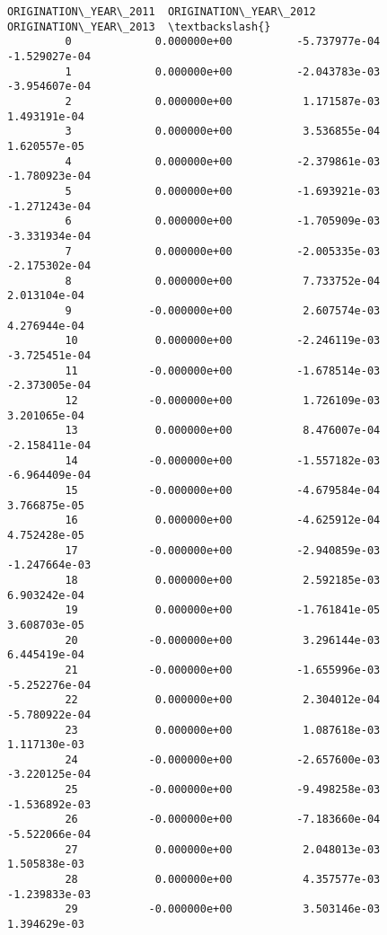 \documentclass[11pt]{article}
\begin{document}
\begin{Verbatim}[commandchars=\\\{\}]
              ORIGINATION\_YEAR\_2011  ORIGINATION\_YEAR\_2012  ORIGINATION\_YEAR\_2013  \textbackslash{}
         0             0.000000e+00          -5.737977e-04          -1.529027e-04   
         1             0.000000e+00          -2.043783e-03          -3.954607e-04   
         2             0.000000e+00           1.171587e-03           1.493191e-04   
         3             0.000000e+00           3.536855e-04           1.620557e-05   
         4             0.000000e+00          -2.379861e-03          -1.780923e-04   
         5             0.000000e+00          -1.693921e-03          -1.271243e-04   
         6             0.000000e+00          -1.705909e-03          -3.331934e-04   
         7             0.000000e+00          -2.005335e-03          -2.175302e-04   
         8             0.000000e+00           7.733752e-04           2.013104e-04   
         9            -0.000000e+00           2.607574e-03           4.276944e-04   
         10            0.000000e+00          -2.246119e-03          -3.725451e-04   
         11           -0.000000e+00          -1.678514e-03          -2.373005e-04   
         12           -0.000000e+00           1.726109e-03           3.201065e-04   
         13            0.000000e+00           8.476007e-04          -2.158411e-04   
         14           -0.000000e+00          -1.557182e-03          -6.964409e-04   
         15           -0.000000e+00          -4.679584e-04           3.766875e-05   
         16            0.000000e+00          -4.625912e-04           4.752428e-05   
         17           -0.000000e+00          -2.940859e-03          -1.247664e-03   
         18            0.000000e+00           2.592185e-03           6.903242e-04   
         19            0.000000e+00          -1.761841e-05           3.608703e-05   
         20           -0.000000e+00           3.296144e-03           6.445419e-04   
         21           -0.000000e+00          -1.655996e-03          -5.252276e-04   
         22            0.000000e+00           2.304012e-04          -5.780922e-04   
         23            0.000000e+00           1.087618e-03           1.117130e-03   
         24           -0.000000e+00          -2.657600e-03          -3.220125e-04   
         25           -0.000000e+00          -9.498258e-03          -1.536892e-03   
         26           -0.000000e+00          -7.183660e-04          -5.522066e-04   
         27            0.000000e+00           2.048013e-03           1.505838e-03   
         28            0.000000e+00           4.357577e-03          -1.239833e-03   
         29           -0.000000e+00           3.503146e-03           1.394629e-03   

\end{Verbatim}
\end{document}
